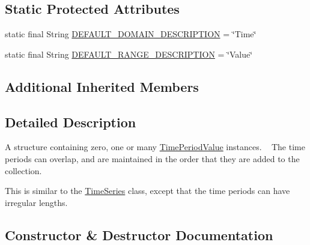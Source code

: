 \subsection*{Static Protected Attributes}
\begin{DoxyCompactItemize}
\item 
static final String \mbox{\hyperlink{classorg_1_1jfree_1_1data_1_1time_1_1_time_period_values_a05c04613387728d82249ea3ad0dbed06}{D\+E\+F\+A\+U\+L\+T\+\_\+\+D\+O\+M\+A\+I\+N\+\_\+\+D\+E\+S\+C\+R\+I\+P\+T\+I\+ON}} = \char`\"{}Time\char`\"{}
\item 
static final String \mbox{\hyperlink{classorg_1_1jfree_1_1data_1_1time_1_1_time_period_values_ae6748013bca6a48582ea2b03919365a8}{D\+E\+F\+A\+U\+L\+T\+\_\+\+R\+A\+N\+G\+E\+\_\+\+D\+E\+S\+C\+R\+I\+P\+T\+I\+ON}} = \char`\"{}Value\char`\"{}
\end{DoxyCompactItemize}
\subsection*{Additional Inherited Members}


\subsection{Detailed Description}
A structure containing zero, one or many \mbox{\hyperlink{classorg_1_1jfree_1_1data_1_1time_1_1_time_period_value}{Time\+Period\+Value}} instances. ~\newline
The time periods can overlap, and are maintained in the order that they are added to the collection. 

This is similar to the \mbox{\hyperlink{classorg_1_1jfree_1_1data_1_1time_1_1_time_series}{Time\+Series}} class, except that the time periods can have irregular lengths. 

\subsection{Constructor \& Destructor Documentation}
\mbox{\label{classorg_1_1jfree_1_1data_1_1time_1_1_time_period_values_a0dd8d3fd9453a5e18d24e7b9f10f346c}} 
